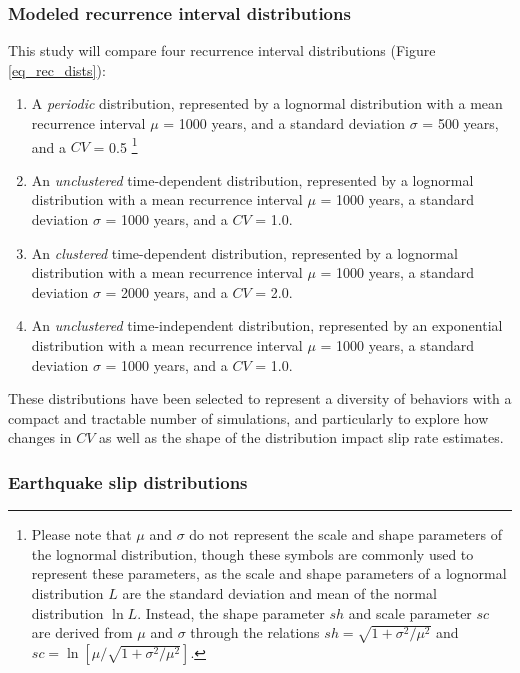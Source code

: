 \documentclass[se, manuscript]{copernicus}
\begin{document}
\subsubsection{Modeled recurrence interval
distributions}\label{modeled-recurrence-interval-distributions}

This study will compare four recurrence interval distributions (Figure
\ref{eq_rec_dists}):

\begin{enumerate}
\def\labelenumi{\arabic{enumi}.}
\item
  A \emph{periodic} distribution, represented by a lognormal
  distribution with a mean recurrence interval \(\mu\) = 1000 years, and
  a standard deviation \(\sigma\) = 500 years, and a \(CV\) =
  0.5 \footnote{Please note that $\mu$ and $\sigma$ do not represent the scale
  and shape parameters of the lognormal distribution, though these symbols are
  commonly used to represent these parameters, as the scale and shape parameters
  of a lognormal distribution $L$ are the standard deviation and mean of the
  normal distribution $\ln L$. Instead, the shape parameter $sh$
  and scale parameter $sc$ are derived from $\mu$ and $\sigma$ through the
  relations $sh = \sqrt{1 + \sigma^2 / \mu^2}$ and 
  $sc = \ln [ \mu / \sqrt{1 + \sigma^2 / \mu^2}]$.}
\item
  An \emph{unclustered} time-dependent distribution, represented by a
  lognormal distribution with a mean recurrence interval \(\mu\) = 1000
  years, a standard deviation \(\sigma\) = 1000 years, and a \(CV\) =
  1.0.
\item
  An \emph{clustered} time-dependent distribution, represented by a
  lognormal distribution with a mean recurrence interval \(\mu\) = 1000
  years, a standard deviation \(\sigma\) = 2000 years, and a \(CV\) =
  2.0.
\item
  An \emph{unclustered} time-independent distribution, represented by an
  exponential distribution with a mean recurrence interval \(\mu\) =
  1000 years, a standard deviation \(\sigma\) = 1000 years, and a
  \(CV\) = 1.0.
\end{enumerate}

These distributions have been selected to represent a diversity of
behaviors with a compact and tractable number of simulations, and
particularly to explore how changes in \(CV\) as well as the shape of
the distribution impact slip rate estimates.

\subsubsection{Earthquake slip
distributions}\label{earthquake-slip-distributions}
\end{document}
